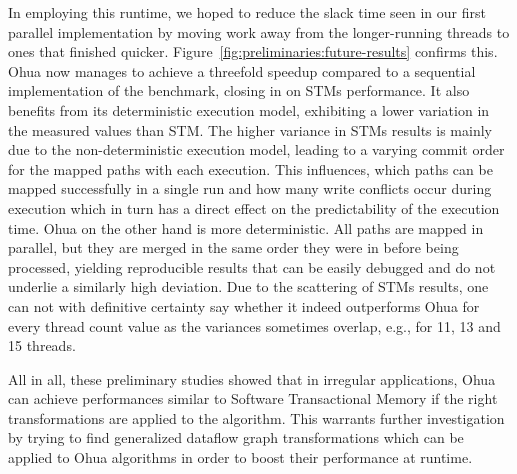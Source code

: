 In employing this runtime, we hoped to reduce the slack time seen in our first parallel implementation by moving work away from the longer-running threads to ones that finished quicker.
Figure~\ref{fig:preliminaries:future-results} confirms this.
Ohua now manages to achieve a threefold speedup compared to a sequential implementation of the benchmark, closing in on STMs performance.
It also benefits from its deterministic execution model, exhibiting a lower variation in the measured values than STM.
The higher variance in STMs results is mainly due to the non-deterministic execution model, leading to a varying commit order for the mapped paths with each execution.
This influences, which paths can be mapped successfully in a single run and how many write conflicts occur during execution which in turn has a direct effect on the predictability of the execution time.
Ohua on the other hand is more deterministic.
All paths are mapped in parallel, but they are merged in the same order they were in before being processed, yielding reproducible results that can be easily debugged and do not underlie a similarly high deviation.
Due to the scattering of STMs results, one can not with definitive certainty say whether it indeed outperforms Ohua for every thread count value as the variances sometimes overlap, e.g., for 11, 13 and 15 threads.

All in all, these preliminary studies showed that in irregular applications, Ohua can achieve performances similar to Software Transactional Memory if the right transformations are applied to the algorithm.
This warrants further investigation by trying to find generalized dataflow graph transformations which can be applied to Ohua algorithms in order to boost their performance at runtime.

